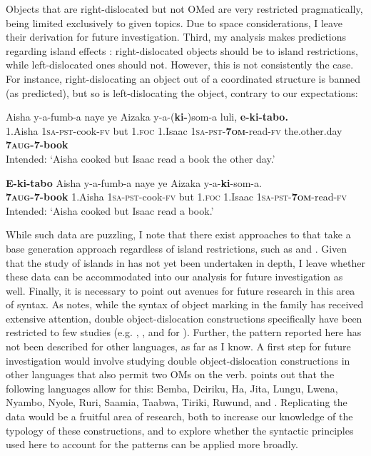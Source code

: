 \documentclass[output=paper
,newtxmath
,modfonts
,nonflat]{langsci/langscibook}
\begin{document}
Objects that are right-dislocated but not OMed are very restricted pragmatically, being limited exclusively to given topics. Due to space considerations, I leave their derivation for future investigation. Third, my analysis makes predictions regarding island effects \citep{Boeckx2012}: right-dislocated objects should be  to island restrictions, while left-dislocated ones should not. However, this is not consistently the case. For instance, right-dislocating an object out of a coordinated structure is banned (as predicted), but so is left-dislocating the object, contrary to our expectations:

\ea\label{ex:ranero:43}
\gll *Aisha  y-a-fumb-a          naye ye      Aizaka  y-a-(\textbf{ki-})som-a            luli,              \textbf{e-ki-tabo.} \\
1.Aisha \textsc{1sa-pst}{}-cook-\textsc{fv} but   1.\textsc{foc} 1.Isaac  \textsc{1sa-pst}{}-\textbf{\textsc{7om}}{}-read-\textsc{fv} the.other.day \textbf{7\textsc{aug}}\textbf{{}-7-book}\\
\glt Intended: ‘Aisha cooked but Isaac read a book the other day.’
\z

\ea\label{ex:ranero:44}
\gll *\textbf{E-ki-tabo}     Aisha    y-a-fumb-a   naye ye       Aizaka y-a-\textbf{ki}{}-som-a.\\
\textbf{7\textsc{aug}}\textbf{{}-7-book} 1.Aisha \textsc{1sa-pst}{}-cook\textsc{{}-fv} but   1.\textsc{foc} 1.Isaac \textsc{1sa-pst}{}-\textbf{7\textsc{om}}{}-read-\textsc{fv}\\
\glt Intended: ‘Aisha cooked but Isaac read a book.’
\z

\textup{While such data are puzzling, I note that there exist approaches to \linebreak {} that take a base generation approach regardless of island restrictions, such as \citet{Cinque1990} and \citet{iatridou1995}. Given that the study of islands in  has not yet been undertaken in depth, I leave whether these data can be accommodated into our analysis for future investigation as well. Finally, it is necessary to point out avenues for future research in this area of  syntax. As \citet{Zeller2015} notes, while the syntax of object marking in the family has received extensive attention, double object-dislocation constructions specifically have been restricted to few studies (e.g. \citealt{Adams2010}, \citealt{zeller2009}, and \citealt{Zeller2015} for ). Further, the pattern reported here has not been described for other  languages, as far as I know. A first step for future investigation would involve studying double object-dislocation constructions in other  languages that also permit two OMs on the verb. \citet{Marlo2015} points out that the following languages allow for this: Bemba, Dciriku, Ha, Jita, Lungu, Lwena, Nyambo, Nyole, Ruri, Saamia, Taabwa, Tiriki, Ruwund, and . Replicating the  data would be a fruitful area of research, both to increase our knowledge of the typology of these constructions, and to explore whether the syntactic principles used here to account for the  patterns can be applied more broadly.}
\end{document}
